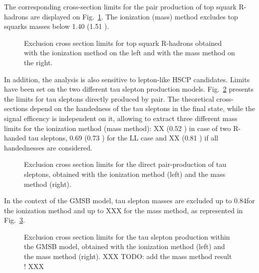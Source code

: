 The corresponding cross-section limits for the pair production of top squark R-hadrons are displayed on Fig.~\ref{fig:massLim2}.
The ionization (mass) method excludes top squarks masses below 1.40 \TeV (1.51 \TeV). 


\begin{figure}[h!]
   \centering
	\caption{Exclusion cross section limits for top squark R-hadrons 
	obtained with the ionization method on the left and with  the mass method on the right.}
   \label{fig:massLim2}
\end{figure}


In addition, the analysis is also sensitive to lepton-like HSCP candidates. Limits have been set on the two different tau slepton production models. 
Fig.~\ref{fig:massLim3} presents the limits for tau sleptons directly produced by pair. 
The theoretical cross-sections depend on the handedness of the tau sleptons in the final state, while the signal efficency is independent on it,
allowing to extract three different mass limits for the ionization method (mass method): XX \TeV (0.52 \TeV) in case of two R-handed tau sleptons, 
0.69 \TeV (0.73 \TeV) for the LL case and XX \TeV (0.81 \TeV) if all handednesses are considered.


\begin{figure}[h!]
   \centering
   \caption{Exclusion cross section limits for the 
direct pair-production of tau sleptons, obtained with the ionization method (left) and the mass method (right).} 
	\label{fig:massLim3}
\end{figure}


In the context of the GMSB model, tau slepton masses are excluded  up to 0.84\TeV for  the ionization method
and up to XXX for the mass method,
as represented in Fig.~\ref{fig:massLim4}.

\begin{figure}[h!]
   \centering
    \subfloat{
       \centering
   }
   \caption{Exclusion cross section limits for the tau slepton production within the
 {GMSB} model,
	obtained with the ionization method (left) and the mass method (right). XXX TODO: add the mass method result ! XXX } 
	\label{fig:massLim4}
\end{figure}


